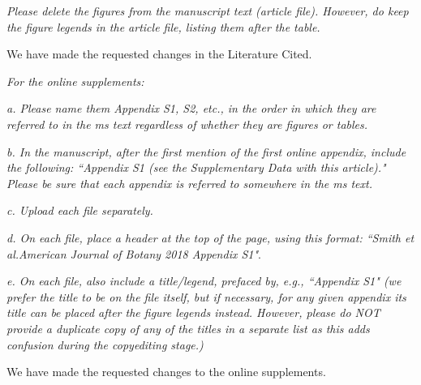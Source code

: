 \documentclass[10.95pt,a4paper]{letter}
\begin{document}
\par \emph{Please delete the figures from the manuscript text (article file).  However, do keep the figure legends in the article file, listing them after the table.}  
\par We have made the requested changes in the Literature Cited. 

\par \emph{For the online supplements:}
\par \emph{a. Please name them Appendix S1, S2, etc., in the order in which they are referred to in the ms text regardless of whether they are figures or tables. } 
\par \emph{b. In the manuscript, after the first mention of the first online appendix, include the following: ``Appendix S1 (see the Supplementary Data with this article)." Please be sure that each appendix is referred to somewhere in the ms text.}
\par \emph{c. Upload each file separately.}  
\par \emph{d. On each file, place a header at the top of the page, using this format: ``Smith et al.American Journal of Botany 2018 Appendix S1"}.
\par \emph{e. On each file, also include a title/legend, prefaced by, e.g., ``Appendix S1" (we prefer the title to be on the file itself, but if necessary, for any given appendix its title can be placed after the figure legends instead. However, please do NOT provide a duplicate copy of any of the titles in a separate list as this adds confusion during the copyediting stage.)}
\par We have made the requested changes to the online supplements. 
\end{document}
